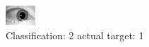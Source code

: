 \begin{figure}[h!]
\begin{center}
\includegraphics[width=0.60\columnwidth]{figures/ID1551_class_2_target_1.png}
\end{center}
\caption{ Classification: 2 actual target: 1}
\label{fig:ID1551_class_2_target_1}
\end{figure}
